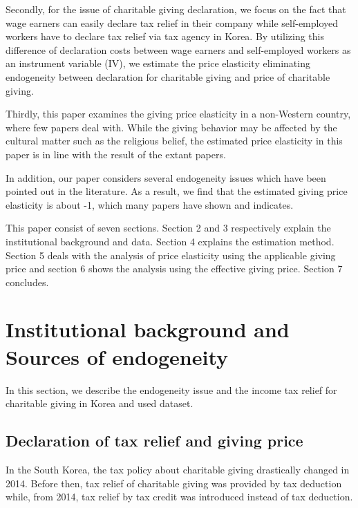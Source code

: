 \documentclass[
  11pt,
  a4paper,
]{article}
\begin{document}
Secondly, for the issue of charitable giving declaration, we focus on the fact that wage earners can easily declare tax relief in their company while self-employed workers have to declare tax relief via tax agency in Korea. By utilizing this difference of declaration costs between wage earners and self-employed workers as an instrument variable (IV), we estimate the price elasticity eliminating endogeneity between declaration for charitable giving and price of charitable giving.

Thirdly, this paper examines the giving price elasticity in a non-Western country, where few papers deal with. While the giving behavior may be affected by the cultural matter such as the religious belief, the estimated price elasticity in this paper is in line with the result of the extant papers.

In addition, our paper considers several endogeneity issues which have been pointed out in the literature. As a result, we find that the estimated giving price elasticity is about -1, which many papers have shown and indicates.

This paper consist of seven sections. Section 2 and 3 respectively explain the institutional background and data. Section 4 explains the estimation method. Section 5 deals with the analysis of price elasticity using the applicable giving price and section 6 shows the analysis using the effective giving price. Section 7 concludes.

\hypertarget{institutional-background-and-sources-of-endogeneity}{%
\section{Institutional background and Sources of endogeneity}\label{institutional-background-and-sources-of-endogeneity}}

In this section, we describe the endogeneity issue and the income tax relief for charitable giving in Korea and used dataset.

\hypertarget{declaration-of-tax-relief-and-giving-price}{%
\subsection{Declaration of tax relief and giving price}\label{declaration-of-tax-relief-and-giving-price}}

In the South Korea, the tax policy about charitable giving drastically changed in 2014. Before then, tax relief of charitable giving was provided by tax deduction while, from 2014, tax relief by tax credit was introduced instead of tax deduction.
\end{document}
